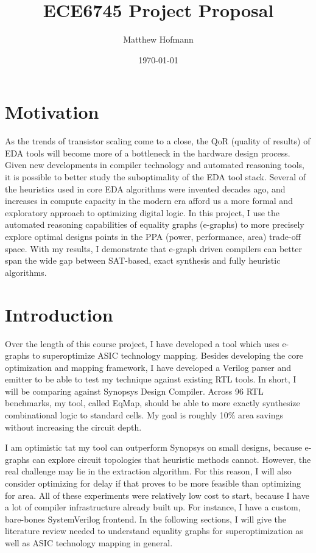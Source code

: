 \documentclass[10pt,letterpaper]{article}
\title{ECE6745 Project Proposal}
\author{Matthew Hofmann}
\date{\today}
\newcommand{\shortname}{EqMap}
\begin{document}
\maketitle


\section{Motivation}\label{sec:motivation}

As the trends of transistor scaling come to a close, the QoR (quality of
results) of EDA tools will become more of a bottleneck in the hardware design
process. Given new developments in compiler technology and automated reasoning
tools, it is possible to better study the suboptimality of the EDA tool stack.
Several of the heuristics used in core EDA algorithms were invented decades
ago, and increases in compute capacity in the modern era afford us a more
formal and exploratory approach to optimizing digital logic. In this project, I
use the automated reasoning capabilities of equality graphs (e-graphs) to more
precisely explore optimal designs points in the PPA (power, performance, area)
trade-off space. With my results, I demonstrate that e-graph driven compilers
can better span the wide gap between SAT-based, exact synthesis and fully
heuristic algorithms.

\section{Introduction}\label{sec:intro}

Over the length of this course project, I have developed a tool which uses
e-graphs to superoptimize ASIC technology mapping. Besides developing the core
optimization and mapping framework, I have developed a Verilog parser and
emitter to be able to test my technique against existing RTL tools. In short, I
will be comparing against Synopsys Design Compiler. Across 96 RTL benchmarks,
my tool, called \shortname{}, should be able to more exactly synthesize
combinational logic to standard cells. My goal is roughly 10\% area savings
without increasing the circuit depth.

I am optimistic tat my tool can outperform Synopsys on small designs, because
e-graphs can explore circuit topologies that heuristic methods cannot. However,
the real challenge may lie in the extraction algorithm. For this reason, I will
also consider optimizing for delay if that proves to be more feasible than
optimizing for area. All of these experiments were relatively low cost to
start, because I have a lot of compiler infrastructure already built up. For
instance, I have a custom, bare-bones SystemVerilog frontend. In the following
sections, I will give the literature review needed to understand equality
graphs for superoptimization as well as ASIC technology mapping in general.
\end{document}

